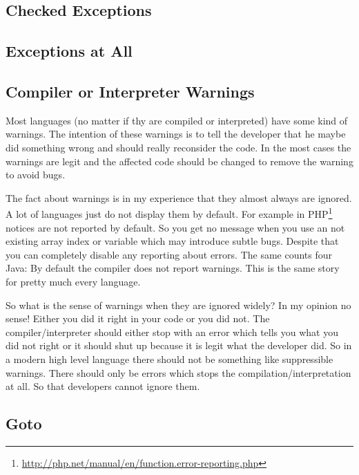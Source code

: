 \documentclass[11pt, a4paper]{report}
\begin{document}
\subsection{Checked Exceptions}


\subsection{Exceptions at All}


\subsection{Compiler or Interpreter Warnings}

Most languages (no matter if thy are compiled or interpreted) have some kind of warnings. The intention of these warnings is to tell the developer that he maybe did something wrong and should really reconsider the code. In the most cases the warnings are legit and the affected code should be changed to remove the warning to avoid bugs.

The fact about warnings is in my experience that they almost always are ignored. A lot of languages just do not display them by default. For example in PHP\footnote{\url{http://php.net/manual/en/function.error-reporting.php}} notices are not reported by default. So you get no message when you use an not existing array index or variable which may introduce subtle bugs. Despite that you can completely disable any reporting about errors. The same counts four Java: By default the compiler does not report warnings. This is the same story for pretty much every language. 

So what is the sense of warnings when they are ignored widely? In my opinion no sense! Either you did it right in your code or you did not. The compiler/interpreter should either stop with an error which tells you what you did not right or it should shut up because it is legit what the developer did. So in a modern high level language there should not be something like suppressible warnings. There should only be errors which stops the compilation/interpretation at all. So that developers cannot ignore them.

\subsection{Goto}
\end{document}
